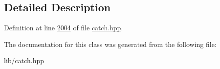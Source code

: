\subsection{Detailed Description}


Definition at line \mbox{\hyperlink{catch_8hpp_source_l02004}{2004}} of file \mbox{\hyperlink{catch_8hpp_source}{catch.\+hpp}}.



The documentation for this class was generated from the following file\+:\begin{DoxyCompactItemize}
\item 
lib/catch.\+hpp\end{DoxyCompactItemize}
